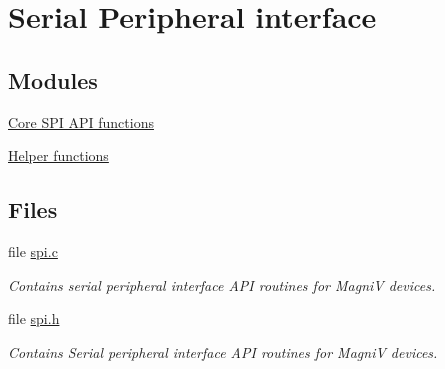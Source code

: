 \hypertarget{group___s_p_i}{}\section{Serial Peripheral interface}
\label{group___s_p_i}
\subsection*{Modules}
\begin{DoxyCompactItemize}
\item 
\hyperlink{group___core_s_p_i}{Core S\+P\+I A\+P\+I functions}
\item 
\hyperlink{group__helper_s_p_i}{Helper functions}
\end{DoxyCompactItemize}
\subsection*{Files}
\begin{DoxyCompactItemize}
\item 
file \hyperlink{spi_8c}{spi.\+c}
\begin{DoxyCompactList}\small\item\em Contains serial peripheral interface A\+P\+I routines for Magni\+V devices. \end{DoxyCompactList}\item 
file \hyperlink{spi_8h}{spi.\+h}
\begin{DoxyCompactList}\small\item\em Contains Serial peripheral interface A\+P\+I routines for Magni\+V devices. \end{DoxyCompactList}\end{DoxyCompactItemize}
